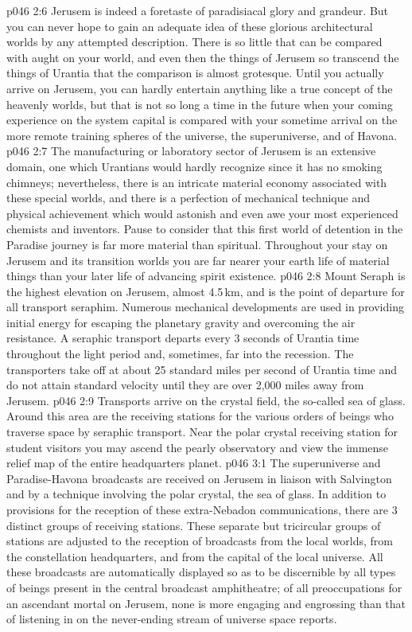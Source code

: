\vs p046 2:6 Jerusem is indeed a foretaste of paradisiacal glory and grandeur. But you can never hope to gain an adequate idea of these glorious architectural worlds by any attempted description. There is so little that can be compared with aught on your world, and even then the things of Jerusem so transcend the things of Urantia that the comparison is almost grotesque. Until you actually arrive on Jerusem, you can hardly entertain anything like a true concept of the heavenly worlds, but that is not so long a time in the future when your coming experience on the system capital is compared with your sometime arrival on the more remote training spheres of the universe, the superuniverse, and of Havona.
\vs p046 2:7 \pc The manufacturing or laboratory sector of Jerusem is an extensive domain, one which Urantians would hardly recognize since it has no smoking chimneys; nevertheless, there is an intricate material economy associated with these special worlds, and there is a perfection of mechanical technique and physical achievement which would astonish and even awe your most experienced chemists and inventors. Pause to consider that this first world of detention in the Paradise journey is far more material than spiritual. Throughout your stay on Jerusem and its transition worlds you are far nearer your earth life of material things than your later life of advancing spirit existence.
\vs p046 2:8 \pc Mount Seraph is the highest elevation on Jerusem, almost 4.5\,km, and is the point of departure for all transport seraphim. Numerous mechanical developments are used in providing initial energy for escaping the planetary gravity and overcoming the air resistance. A seraphic transport departs every 3 seconds of Urantia time throughout the light period and, sometimes, far into the recession. The transporters take off at about 25 standard miles per second of Urantia time and do not attain standard velocity until they are over 2,000 miles away from Jerusem.
\vs p046 2:9 Transports arrive on the crystal field, the so\hyp{}called sea of glass. Around this area are the receiving stations for the various orders of beings who traverse space by seraphic transport. Near the polar crystal receiving station for student visitors you may ascend the pearly observatory and view the immense relief map of the entire headquarters planet.
\vs p046 3:1 The superuniverse and Paradise\hyp{}Havona broadcasts are received on Jerusem in liaison with Salvington and by a technique involving the polar crystal, the sea of glass. In addition to provisions for the reception of these extra\hyp{}Nebadon communications, there are 3 distinct groups of receiving stations. These separate but tricircular groups of stations are adjusted to the reception of broadcasts from the local worlds, from the constellation headquarters, and from the capital of the local universe. All these broadcasts are automatically displayed so as to be discernible by all types of beings present in the central broadcast amphitheatre; of all preoccupations for an ascendant mortal on Jerusem, none is more engaging and engrossing than that of listening in on the never\hyp{}ending stream of universe space reports.
